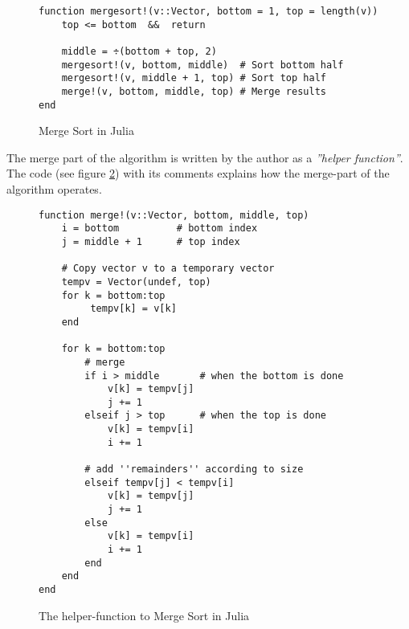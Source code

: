 \documentclass[a4paper, 11pt]{article}
\begin{document}
    \begin{figure}[H]
    \begin{verbatim}
function mergesort!(v::Vector, bottom = 1, top = length(v)) 
    top <= bottom  &&  return

    middle = ÷(bottom + top, 2)
    mergesort!(v, bottom, middle)  # Sort bottom half
    mergesort!(v, middle + 1, top) # Sort top half
    merge!(v, bottom, middle, top) # Merge results
end

    \end{verbatim}
    \caption{Merge Sort in Julia}
    \label{code:mergesort}
    \end{figure}

    \clearpage
    The merge part of the algorithm is written by the author as a \emph{''helper function''}.
    The code (see figure \ref{code:merge}) with its comments explains how the merge-part of
    the algorithm operates. 

    \begin{figure}[H]
    \begin{verbatim}
function merge!(v::Vector, bottom, middle, top)
    i = bottom          # bottom index
    j = middle + 1      # top index

    # Copy vector v to a temporary vector
    tempv = Vector(undef, top)
    for k = bottom:top
         tempv[k] = v[k]
    end

    for k = bottom:top
        # merge
        if i > middle       # when the bottom is done
            v[k] = tempv[j]
            j += 1
        elseif j > top      # when the top is done 
            v[k] = tempv[i]
            i += 1

        # add ''remainders'' according to size 
        elseif tempv[j] < tempv[i] 
            v[k] = tempv[j]
            j += 1
        else
            v[k] = tempv[i]
            i += 1
        end
    end
end
    \end{verbatim}
    \caption{The helper-function to Merge Sort in Julia}
    \label{code:merge}
    \end{figure}    \clearpage
\end{document}
